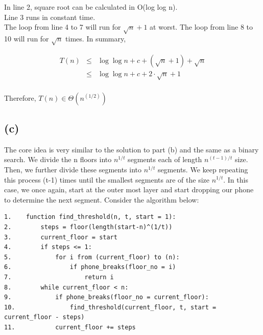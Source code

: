 \documentclass[a4paper,12pt]{article} %
\begin{document}
In line 2, square root can be calculated in O(log log n). \\
Line 3 runs in constant time. \\
The loop from line 4 to 7 will run for $\sqrt{n}+1$ at worst.
The loop from line 8 to 10 will run for $\sqrt{n}$ times.
In summary, 

\begin{eqnarray*}
    T(n) & \leq & \log{\log{n}} + c + (\sqrt{n}+1) + \sqrt{n}\\
    & \leq & \log{\log{n}} + c + 2 \cdot \sqrt{n} + 1\\
\end{eqnarray*}

Therefore, $T(n) \in \Theta(n^{(1/2)})$

\subsection*{(c)}
The core idea is very similar to the solution to part (b) and the same as a binary search. We divide the n floors into $n^{1/t}$ segments each of length $n^{(t-1)/t}$ size. Then, we further divide these segments into $n^{1/t}$ segments. We keep repeating this process (t-1) times until the smallest segments are of the size $n^{1/t}$. In this case, we once again, start at the outer most layer and start dropping our phone to determine the next segment. Consider the algorithm below:

\begin{verbatim}
1.    function find_threshold(n, t, start = 1):
2.        steps = floor(length(start-n)^(1/t))
3.        current_floor = start
4.        if steps <= 1:
5.            for i from (current_floor) to (n):
6.                if phone_breaks(floor_no = i)
7.                    return i
8.        while current_floor < n:       
9.            if phone_breaks(floor_no = current_floor):
10.               find_threshold(current_floor, t, start = current_floor - steps)
11.           current_floor += steps
\end{verbatim}
\end{document}
